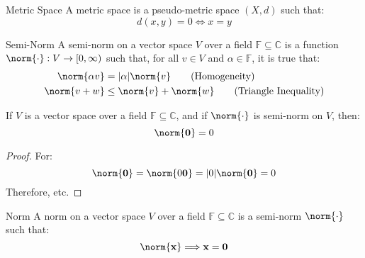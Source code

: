 \documentclass[crop=false,class=article,oneside]{standalone}
\begin{document}
            \begin{ldefinition}{Metric Space}
                A metric space is a pseudo-metric space $(X,d)$ such that:
                \begin{equation}
                    d(x,y)=0\Longleftrightarrow{x}=y
                    \tag{Definiteness}
                \end{equation}
            \end{ldefinition}
            \begin{ldefinition}{Semi-Norm}
                A semi-norm on a vector space $V$ over a field
                $\mathbb{F}\subseteq\mathbb{C}$ is a function
                $\norm{\cdot}:V\rightarrow[0,\infty)$ such that, for
                all $v\in{V}$ and $\alpha\in\mathbb{F}$, it is true that:
                \begin{align}
                    \norm{\alpha{v}}
                    &=|\alpha|\norm{v}
                    \tag{Homogeneity}\\
                    \norm{v+w}
                    &\leq\norm{v}+\norm{w}
                    \tag{Triangle Inequality}
                \end{align}
            \end{ldefinition}
            \begin{theorem}
                If $V$ is a vector space over a field
                $\mathbb{F}\subseteq\mathbb{C}$, and if
                $\norm{\cdot}$ is semi-norm on $V$, then:
                \begin{equation}
                    \norm{\mathbf{0}}=0
                \end{equation}
            \end{theorem}
            \begin{proof}
                For:
                \begin{equation}
                    \norm{\mathbf{0}}=\norm{0\mathbf{0}}=|0|\norm{\mathbf{0}}=0
                \end{equation}
                Therefore, etc.
            \end{proof}
            \begin{ldefinition}{Norm}
                A norm on a vector space $V$ over a field $\mathbb{F}\subseteq\mathbb{C}$
                is a semi-norm $\norm{\cdot}$ such that:
                \begin{equation}
                    \norm{\mathbf{x}}\Longrightarrow\mathbf{x}=\mathbf{0}
                \end{equation}
            \end{ldefinition}
\end{document}
